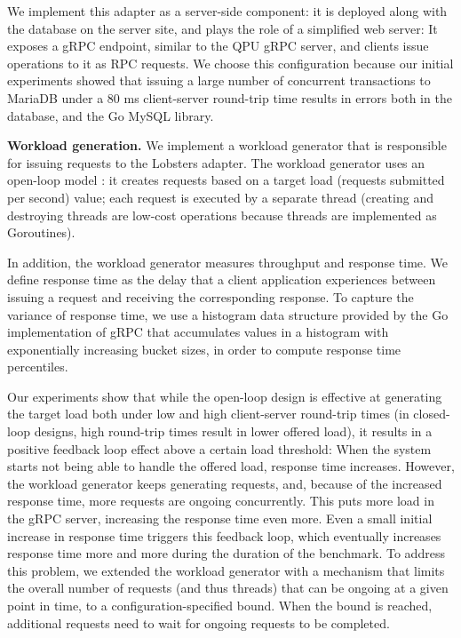We implement this adapter as a server-side component:
it is deployed along with the database on the server site, and plays the role of a simplified web server:
It exposes a gRPC endpoint, similar to the QPU gRPC server, and clients issue operations to it as RPC requests.
We choose this configuration because our initial experiments showed that issuing a large number of concurrent transactions
to MariaDB under a 80 ms client-server round-trip time results in errors both in the database,
and the Go MySQL library.

\bigskip
\noindent
\textbf{Workload generation.}
We implement a workload generator \cite{lobsters:bench} that is responsible for issuing
requests to the Lobsters adapter.
The workload generator uses an open-loop model \cite{schroeder:cautionarytale}:
it creates requests based on a target load (requests submitted per second) value;
each request is executed by a separate thread (creating and destroying threads are low-cost operations because threads are
implemented as Goroutines).

In addition, the workload generator measures throughput and response time.
We define response time as the delay that a client application experiences between issuing a request and receiving the
corresponding response.
To capture the variance of response time, we use a histogram data structure provided by the Go implementation of gRPC \cite{grpcgo:histogram}
that accumulates values in a histogram with exponentially increasing bucket sizes, in order to compute response time percentiles.

Our experiments show that while the open-loop design is effective at generating the target load
both under low and high client-server round-trip times (in closed-loop designs, high round-trip times result in lower offered load),
it results in a positive feedback loop effect above a certain load threshold:
When the system starts not being able to handle the offered load, response time increases.
However, the workload generator keeps generating requests, and, because of the increased response time,
more requests are ongoing concurrently.
This puts more load in the gRPC server, increasing the response time even more.
Even a small initial increase in response time triggers this feedback loop,
which eventually increases response time more and more during the duration of the benchmark.
To address this problem, we extended the workload generator with a mechanism that limits the overall number of requests
(and thus threads) that can be ongoing at a given point in time, to a configuration-specified bound.
When the bound is reached, additional requests need to wait for ongoing requests to be completed.


